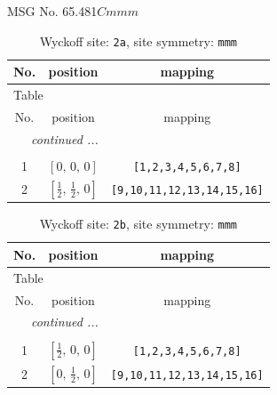 \documentclass[fleqn,8pt]{jsarticle}
\begin{document}
\setcounter{MaxMatrixCols}{32}

\renewcommand{\tablename}{Table~}
\renewcommand{\figurename}{Figure~}
\begin{center}
\LARGE
MSG No. 65.481\quad$Cmmm$
\end{center}
\renewcommand{\arraystretch}{1.2}
\begin{longtable}{ccc}
\caption{Wyckoff site: {\tt 2a}, site symmetry: {\tt mmm}}
 \\
 \hline \hline
No. & position & mapping \\ \hline \endfirsthead

\multicolumn{2}{l}{\tablename\ \thetable{}} \\
 \hline \hline
No. & position & mapping \\ \hline \endhead

 \hline \hline
\multicolumn{2}{r}{\footnotesize\it continued ...} \\ \endfoot

 \hline \hline
\multicolumn{2}{r}{} \\ \endlastfoot

1 & $\left[ 0,\, 0,\, 0 \right]$ & {\tt [1,2,3,4,5,6,7,8]} \\ \hline
2 & $\left[ \frac{1}{2},\, \frac{1}{2},\, 0 \right]$ & {\tt [9,10,11,12,13,14,15,16]} \\
\end{longtable}
\renewcommand{\arraystretch}{1.2}
\begin{longtable}{ccc}
\caption{Wyckoff site: {\tt 2b}, site symmetry: {\tt mmm}}
 \\
 \hline \hline
No. & position & mapping \\ \hline \endfirsthead

\multicolumn{2}{l}{\tablename\ \thetable{}} \\
 \hline \hline
No. & position & mapping \\ \hline \endhead

 \hline \hline
\multicolumn{2}{r}{\footnotesize\it continued ...} \\ \endfoot

 \hline \hline
\multicolumn{2}{r}{} \\ \endlastfoot

1 & $\left[ \frac{1}{2},\, 0,\, 0 \right]$ & {\tt [1,2,3,4,5,6,7,8]} \\ \hline
2 & $\left[ 0,\, \frac{1}{2},\, 0 \right]$ & {\tt [9,10,11,12,13,14,15,16]} \\
\end{longtable}
\end{document}
